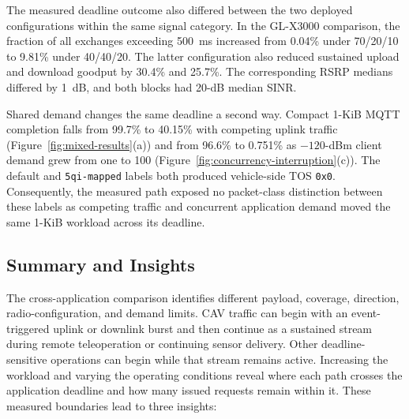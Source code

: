 The measured deadline outcome also differed between the two deployed
configurations within the same signal category. In the GL-X3000 comparison, the fraction of
all exchanges exceeding 500~ms increased from 0.04\% under 70/20/10 to 9.81\%
under 40/40/20. The latter configuration also reduced sustained upload and
download goodput by 30.4\% and 25.7\%. The corresponding RSRP medians differed
by 1~dB, and both blocks had 20-dB median SINR.

Shared demand changes the same deadline a second way. Compact 1-KiB MQTT completion falls
from 99.7\% to 40.15\% with competing uplink traffic
(Figure~\ref{fig:mixed-results}(a)) and from 96.6\% to 0.751\% as $-120$-dBm
client demand grew from one to 100
(Figure~\ref{fig:concurrency-interruption}(c)). The default and
\texttt{5qi-mapped} labels both produced vehicle-side TOS \texttt{0x0}.
Consequently, the measured path exposed no packet-class distinction between
these labels as competing traffic and concurrent application demand moved the
same 1-KiB workload across its deadline.

\FloatBarrier
\subsection{Summary and Insights}
\label{sec:results-insights}

The cross-application comparison identifies different payload, coverage,
direction, radio-configuration, and demand limits. CAV traffic can begin with
an event-triggered uplink or downlink burst and then continue as a sustained
stream during remote teleoperation or continuing sensor delivery. Other
deadline-sensitive operations can begin while that stream remains active.
Increasing the workload and varying the operating conditions reveal where each
path crosses the application deadline and how many issued requests remain
within it. These measured boundaries lead to three insights:

